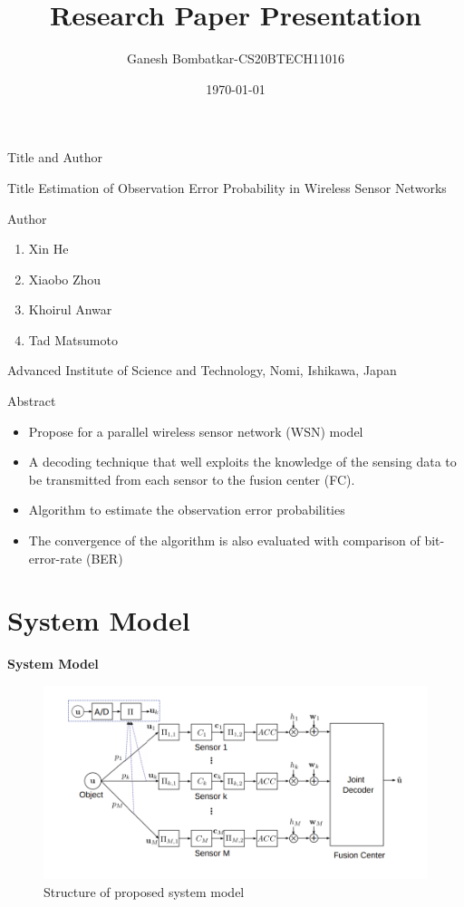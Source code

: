\documentclass{beamer}
\title{Research Paper Presentation}
\author{Ganesh Bombatkar-CS20BTECH11016}
\institute{}
\date{\today}
\begin{document}
\begin{frame}
\titlepage
\end{frame}

\begin{frame}{Title and Author}
    \begin{block}{Title}
    Estimation of Observation Error Probability in Wireless Sensor Networks
    \end{block}
    
    \begin{block}{Author}
    \begin{enumerate}
        \item Xin He
        \item Xiaobo Zhou
        \item Khoirul Anwar
        \item Tad Matsumoto 
    \end{enumerate}
    Advanced Institute of Science and Technology, Nomi, Ishikawa, Japan
    
    \end{block}
\end{frame}

\begin{frame}{Abstract}
    \begin{itemize}
        \item Propose for a parallel wireless sensor network (WSN) model
        \item A decoding technique that well exploits the knowledge of the sensing data to be transmitted from each sensor to the fusion center (FC).
        \item Algorithm to estimate the observation error probabilities
        \item The convergence of the algorithm is also evaluated with comparison of bit-error-rate (BER)
    \end{itemize}
\end{frame}

\section{System Model}
\begin{frame}{\textbf{System Model}}
    \begin{figure}
        \centering
        \includegraphics[scale=0.4]{figures/SystemModel.png}
        \caption{Structure of proposed system model}
        \label{fig:systemmodel}
    \end{figure}    
\end{frame}
\end{document}
